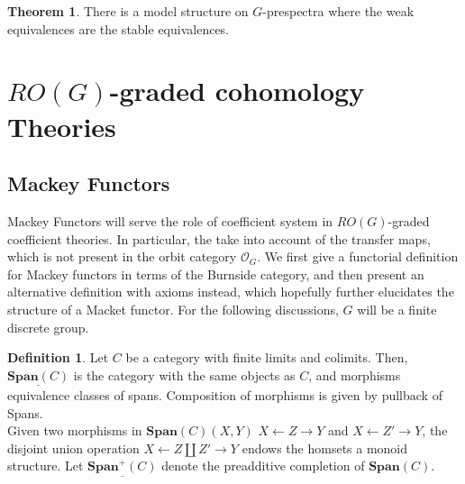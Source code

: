 \documentclass{article}
\theoremstyle{definition}
\newtheorem{theorem}{Theorem}[section]
\theoremstyle{definition}
\newtheorem{definition}{Definition}[theorem]
\theoremstyle{definition}
\theoremstyle{definition}
\theoremstyle{definition}
\theoremstyle{definition}
\theoremstyle{definition}
\begin{document}
\begin{tcolorbox}[colback=red!5!white,colframe=red!30!white]
\begin{theorem}
There is a model structure on $G$-prespectra where the weak equivalences are the stable equivalences. 
\end{theorem}
\end{tcolorbox}














\section{$RO(G)$-graded cohomology Theories}
\subsection{Mackey Functors}
Mackey Functors will serve the role of coefficient system in $RO(G)$-graded coefficient theories. In particular, the take into account of the transfer maps, which is not present in the orbit category $\mathcal{O}_G$. We first give a functorial definition for Mackey functors in terms of the Burnside category, and then present an alternative definition with axioms instead, which hopefully further elucidates the structure of a Macket functor. For the following discussions, $G$ will be a finite discrete group.


\begin{tcolorbox}[colback=purple!5!white,colframe=purple!75!black]
\begin{definition}
Let $C$ be a category with finite limits and colimits. Then, $\underline{\textbf{Span}(C)}$ is the category with the same objects as $C$, and morphisms equivalence classes of spans. Composition of morphisms is given by pullback of Spans.\\

Given two morphisms in $\textbf{Span}(C)(X,Y)$ $X\leftarrow Z\rightarrow Y$ and $X\leftarrow Z'\rightarrow Y$, the disjoint union operation $X\leftarrow Z\coprod Z'\rightarrow Y$ endows the homsets a monoid structure. Let $\underline{\textbf{Span}^+(C)}$ denote the preadditive completion of $\textbf{Span}(C)$. 
\end{definition}
\end{tcolorbox}
\end{document}
